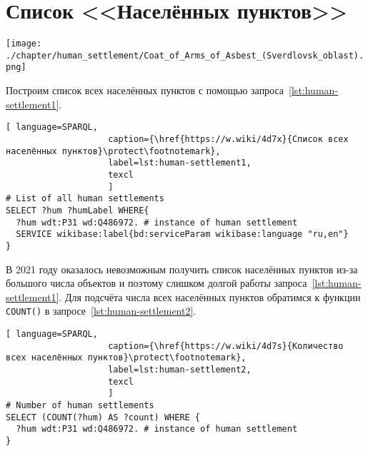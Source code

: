 \section{Список <<Населённых пунктов>>}
\begin{marginfigure}[0.0cm]
{\texttt{[image: ./chapter/human\_settlement/Coat\_of\_Arms\_of\_Asbest\_(Sverdlovsk\_oblast).png]}}
  \caption{Это герб населённого пункта России или другой страны?\newline%
См. ответ~\protect\ref{answer:flag_human_settlements} на с.~\protect\pageref{answer:flag_human_settlements}.}
  \label{fig:flag_question_human_settlements2}%
\end{marginfigure}

Построим список всех населённых пунктов с помощью запроса~\ref{lst:human-settlement1}.

\begin{lstlisting}[ language=SPARQL, 
                    caption={\href{https://w.wiki/4d7x}{Список всех населённых пунктов}\protect\footnotemark},
                    label=lst:human-settlement1,
                    texcl 
                    ]
# List of all human settlements
SELECT ?hum ?humLabel WHERE{
  ?hum wdt:P31 wd:Q486972. # instance of human settlement
  SERVICE wikibase:label{bd:serviceParam wikibase:language "ru,en"}
}
\end{lstlisting}%

В 2021 году оказалось невозможным получить список населённых пунктов 
из-за большого числа объектов и поэтому слишком долгой работы запроса~\ref{lst:human-settlement1}. 
Для подсчёта числа всех населённых пунктов обратимся к функции \lstinline|COUNT()| 
в запросе~\ref{lst:human-settlement2}.

\begin{lstlisting}[ language=SPARQL, 
                    caption={\href{https://w.wiki/4d7s}{Количество всех населённых пунктов}\protect\footnotemark},
                    label=lst:human-settlement2,
                    texcl 
                    ]
# Number of human settlements
SELECT (COUNT(?hum) AS ?count) WHERE {
  ?hum wdt:P31 wd:Q486972. # instance of human settlement  
}
\end{lstlisting}%

